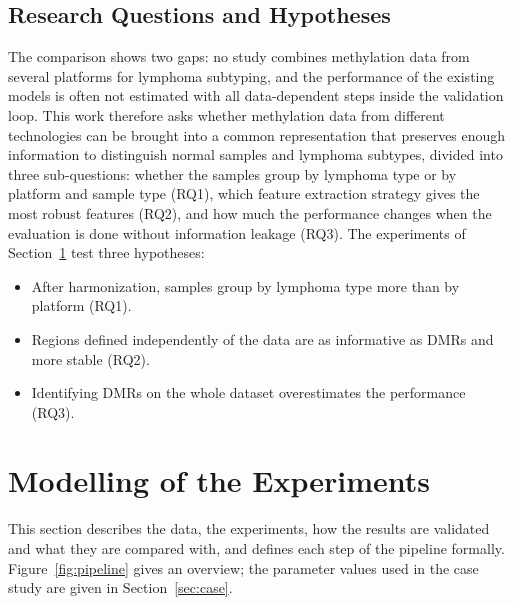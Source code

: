 \documentclass[runningheads]{llncs}
\begin{document}
\subsection{Research Questions and Hypotheses}\label{sec:hypotheses}
The comparison shows two gaps: no study combines methylation data from several platforms for lymphoma subtyping, and the performance of the existing models is often not estimated with all data-dependent steps inside the validation loop. This work therefore asks whether methylation data from different technologies can be brought into a common representation that preserves enough information to distinguish normal samples and lymphoma subtypes, divided into three sub-questions: whether the samples group by lymphoma type or by platform and sample type (RQ1), which feature extraction strategy gives the most robust features (RQ2), and how much the performance changes when the evaluation is done without information leakage (RQ3). The experiments of Section~\ref{sec:model} test three hypotheses:
\begin{itemize}
\item[\textbf{H1}] After harmonization, samples group by lymphoma type more than by platform (RQ1).
\item[\textbf{H2}] Regions defined independently of the data are as informative as DMRs and more stable (RQ2).
\item[\textbf{H3}] Identifying DMRs on the whole dataset overestimates the performance~\cite{varma2006} (RQ3).
\end{itemize}

\section{Modelling of the Experiments}\label{sec:model}

This section describes the data, the experiments, how the results are validated and what they are compared with, and defines each step of the pipeline formally. Figure~\ref{fig:pipeline} gives an overview; the parameter values used in the case study are given in Section~\ref{sec:case}.
\end{document}
